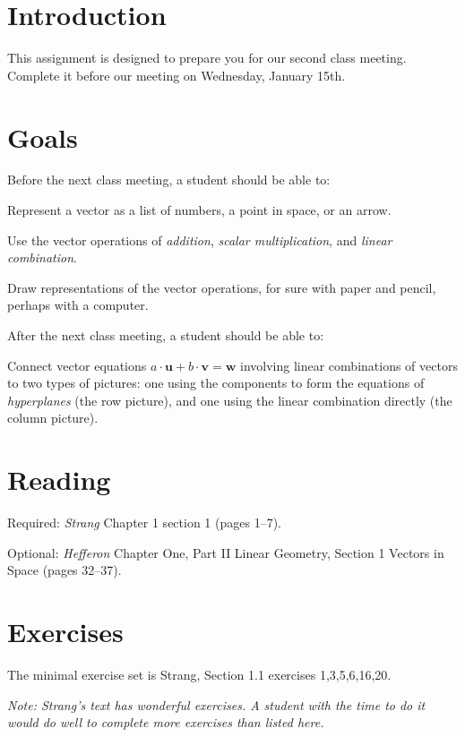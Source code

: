 \documentclass[12pt,letterpaper]{article}
\theoremstyle{definition}
\begin{document}
\setlength{\parskip}{1ex plus 0.5ex minus 0.2ex}
\setlength{\parindent}{0pt}

\pagestyle{fancy}
\cfoot{}

\section*{Introduction}
This assignment is designed to prepare you for our second class meeting.  Complete it before our meeting on Wednesday, January 15th.

\section*{Goals}
Before the next class meeting, a student should be able to:
\begin{compactitem}
\item Represent a vector as a list of numbers, a point in space, or an arrow.
\item Use the vector operations of \emph{addition}, \emph{scalar multiplication}, and \emph{linear combination}.
\item Draw representations of the vector operations, for sure with paper and pencil, perhaps with a computer.
\end{compactitem}
After the next class meeting, a student should be able to:
\begin{compactitem}
\item Connect vector equations $a\cdot\mathbf{u} + b\cdot \mathbf{v} = \mathbf{w}$ involving linear combinations of vectors to two types of pictures: one using the components to form the equations of \emph{hyperplanes} (the row picture), and one using the linear combination directly (the column picture).
\end{compactitem}

\section*{Reading}
\begin{compactdesc}
\item[Required:] \emph{Strang} Chapter 1 section 1 (pages 1--7).
\item[Optional:] \emph{Hefferon} Chapter One, Part II Linear Geometry, Section 1 Vectors in Space (pages 32--37).
\end{compactdesc}

\section*{Exercises}
The minimal exercise set is Strang, Section 1.1 exercises 1,3,5,6,16,20.

\emph{Note: Strang's text has wonderful exercises. A student with the time to do it would do well to complete more exercises than listed here.}


\end{document}
